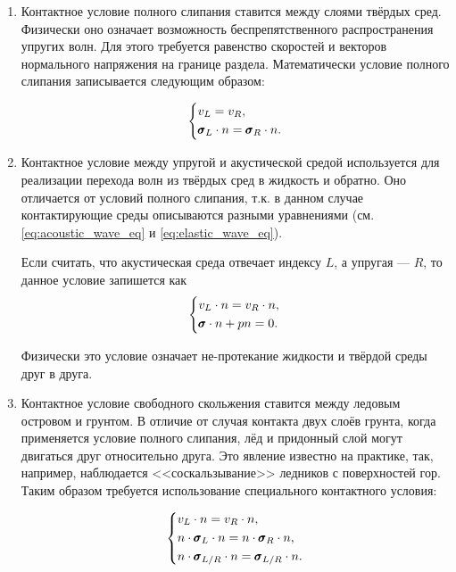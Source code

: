 \begin{enumerate}
    \item Контактное условие полного слипания ставится между слоями твёрдых сред. Физически оно означает возможность беспрепятственного распространения уп\-ругих волн. Для этого требуется равенство скоростей и векторов нормального напряжения на границе раздела. Математически условие полного слипания записывается следующим образом:
    
    \begin{equation*}
    \begin{dcases}
        v_L = v_R ,\\
        \pmb{\sigma}_L \cdot n = \pmb{\sigma}_R \cdot n .
    \end{dcases}
    \end{equation*}
    
    \item Контактное условие между упругой и акустической средой используется для реализации перехода волн из твёрдых сред в жидкость и обратно. Оно отличается от условий полного слипания, т.к. в данном случае контактирующие среды описываются разными уравнениями (см. \eqref{eq:acoustic_wave_eq} и  \eqref{eq:elastic_wave_eq}).
    
    Если считать, что акустическая среда отвечает индексу $L$, а упругая --- $R$, то данное условие запишется как
    \begin{equation*}
    \begin{dcases}
        v_L \cdot n = v_R \cdot n , \\
        \pmb{\sigma} \cdot n + p n = 0 .
    \end{dcases}
    \end{equation*}
    
    Физически это условие означает не-протекание жидкости и твёрдой среды друг в друга.
    
    \item Контактное условие свободного скольжения ставится между ледовым островом и грунтом. В отличие от случая контакта двух слоёв грунта, когда применяется условие полного слипания, лёд и придонный слой могут двигаться друг относительно друга. Это явление известно на практике, так, например, наблюдается <<соскальзывание>> ледников с поверхностей гор. Таким образом требуется использование специального контактного условия:
    
    \begin{equation*}
    \begin{dcases}
        v_L \cdot n = v_R \cdot n , \\
        n \cdot \pmb{\sigma}_L \cdot n = n \cdot \pmb{\sigma}_R \cdot n, \\
        n \cdot \pmb{\sigma}_{L/R} \cdot n = \pmb{\sigma}_{L/R} \cdot n .
    \end{dcases}
    \end{equation*}
    

\end{enumerate}
